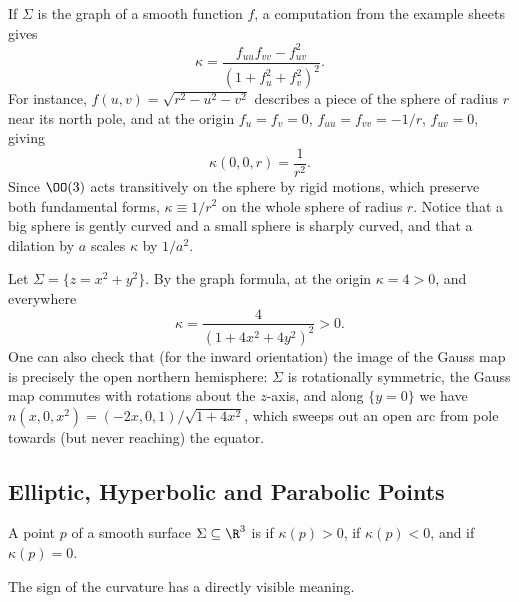 \begin{example}\label{ex:graphcurvature}
    If $\Sigma$ is the graph of a smooth function $f$, a computation from the example sheets gives
    $$
    \kappa = \frac{f_{uu} f_{vv} - f_{uv}^2}{(1 + f_u^2 + f_v^2)^2}.
    $$
    For instance, $f(u, v) = \sqrt{r^2 - u^2 - v^2}$ describes a piece of the sphere of radius $r$ near its north pole, and at the origin $f_u = f_v = 0$, $f_{uu} = f_{vv} = -1/r$, $f_{uv} = 0$, giving
    $$
    \kappa(0, 0, r) = \frac{1}{r^2}.
    $$
    Since $\OO(3)$ acts transitively on the sphere by rigid motions, which preserve both fundamental forms, $\kappa \equiv 1/r^2$ on the whole sphere of radius $r$. Notice that a big sphere is gently curved and a small sphere is sharply curved, and that a dilation by $a$ scales $\kappa$ by $1/a^2$.
\end{example}

\begin{example}
    Let $\Sigma = \{z = x^2 + y^2\}$. By the graph formula, at the origin $\kappa = 4 > 0$, and everywhere
    $$
    \kappa = \frac{4}{(1 + 4x^2 + 4y^2)^2} > 0.
    $$
    One can also check that (for the inward orientation) the image of the Gauss map is precisely the open northern hemisphere: $\Sigma$ is rotationally symmetric, the Gauss map commutes with rotations about the $z$-axis, and along $\{y = 0\}$ we have $n(x, 0, x^2) = (-2x, 0, 1)/\sqrt{1 + 4x^2}$, which sweeps out an open arc from pole towards (but never reaching) the equator.
\end{example}

\subsection{Elliptic, Hyperbolic and Parabolic Points}

\begin{definition}
    A point $p$ of a smooth surface $\Sigma \subseteq \R^3$ is
     if $\kappa(p) > 0$,  if $\kappa(p) < 0$, and  if $\kappa(p) = 0$.
\end{definition}

The sign of the curvature has a directly visible meaning.


